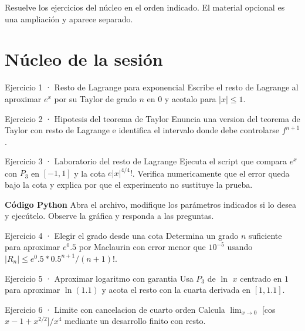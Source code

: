 \documentclass[10pt,a4paper,oneside,openany]{book}
\begin{document}
Resuelve los ejercicios del núcleo en el orden indicado. El material opcional es una ampliación y aparece separado.
\section*{Núcleo de la sesión}
\begin{PSevenExerciseFixed}{Ejercicio 1 · Resto de Lagrange para exponencial}
Escribe el resto de Lagrange al aproximar \(e^x\) por su Taylor de grado \(n\) en \(0\) y acotalo para \(|x|\le 1\).
\end{PSevenExerciseFixed}
\begin{PSevenExerciseFixed}{Ejercicio 2 · Hipotesis del teorema de Taylor}
Enuncia una version del teorema de Taylor con resto de Lagrange e identifica el intervalo donde debe controlarse \(f^{n+1}\).
\end{PSevenExerciseFixed}
\begin{PSevenExercise}{Ejercicio 3 · Laboratorio del resto de Lagrange}
Ejecuta el script que compara \(e^x\) con \(P_3\) en \([-1,1]\) y la cota \(e|x|^{4/4}!\). Verifica numericamente que el error queda bajo la cota y explica por que el experimento no sustituye la prueba.
\par\medskip\textbf{Código Python}
Abra el archivo, modifique los parámetros indicados si lo desea y
ejecútelo. Observe la gráfica y responda a las preguntas.\par\smallskip
{}
\end{PSevenExercise}
\begin{PSevenExerciseFixed}{Ejercicio 4 · Elegir el grado desde una cota}
Determina un grado \(n\) suficiente para aproximar \(e^{0}.5\) por Maclaurin con error menor que \(10^{-5}\) usando \(|R_n|\le e^{0}.5*0.5^{n+1}/(n+1)!\).
\end{PSevenExerciseFixed}
\begin{PSevenExerciseFixed}{Ejercicio 5 · Aproximar logaritmo con garantia}
Usa \(P_3\) de \(\ln\) \(x\) centrado en \(1\) para aproximar \(\ln(1.1)\) y acota el resto con la cuarta derivada en \([1,1.1]\).
\end{PSevenExerciseFixed}
\begin{PSevenExerciseFixed}{Ejercicio 6 · Limite con cancelacion de cuarto orden}
Calcula \(\lim_{x\to 0}\) [cos \(x-1+x^{2/2}]/x^{4}\) mediante un desarrollo finito con resto.
\end{PSevenExerciseFixed}
\end{document}
